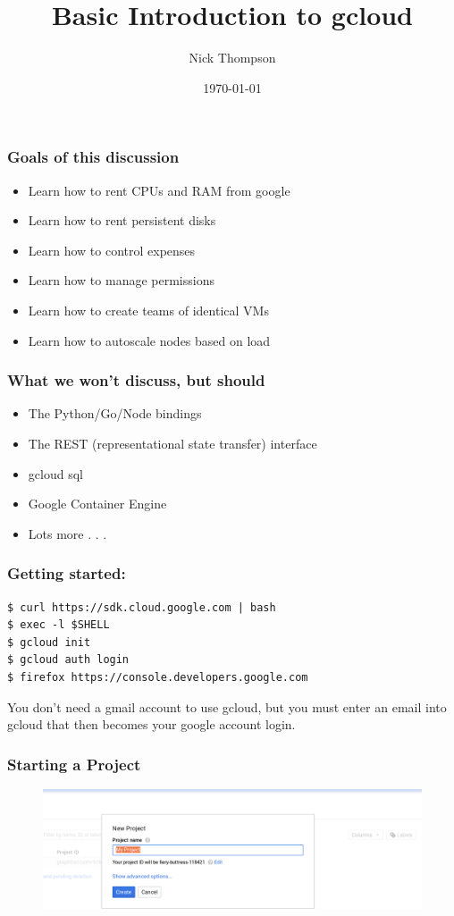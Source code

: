 \documentclass[9pt]{beamer}
\begin{document}
\title{Basic Introduction to gcloud}
\author{Nick Thompson} 
\date{\today}

\frame{\titlepage}

\begin{frame}[fragile]
  \frametitle{Goals of this discussion}
  \pause
  \begin{itemize}
  \item Learn how to rent CPUs and RAM from google
    \pause
  \item Learn how to rent persistent disks
    \pause
  \item Learn how to control expenses
    \pause
  \item Learn how to manage permissions
    \pause
  \item Learn how to create teams of identical VMs
    \pause
  \item Learn how to autoscale nodes based on load
  \end{itemize}
\end{frame}

\begin{frame}[fragile]
  \frametitle{What we won't discuss, but should}
  \pause
  \begin{itemize}
  \item The Python/Go/Node bindings
    \pause
  \item The REST (representational state transfer) interface
    \pause
  \item gcloud sql
    \pause
  \item Google Container Engine
    \pause
  \item Lots more . . .
  \end{itemize}
\end{frame}

\begin{frame}[fragile]
\frametitle{Getting started:}
\begin{verbatim}
$ curl https://sdk.cloud.google.com | bash
$ exec -l $SHELL
$ gcloud init
$ gcloud auth login
$ firefox https://console.developers.google.com
\end{verbatim}
You don't need a gmail account to use gcloud, but you must enter an email into gcloud that then becomes your google account login.
\end{frame}

\begin{frame}[fragile]
  \frametitle{Starting a Project}
  \begin{figure}
    \includegraphics[scale=0.2]{figures/CreateProject.png}
  \end{figure}
\end{frame}
\end{document}
